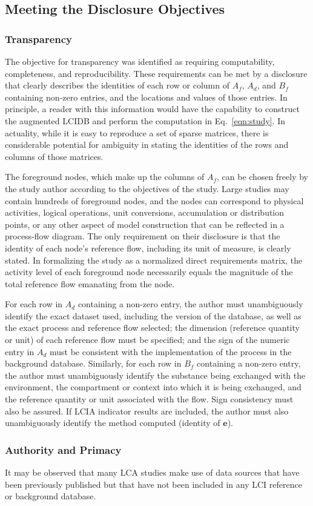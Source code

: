 


\subsection{Meeting the Disclosure Objectives}

\subsubsection{Transparency}

The objective for transparency was identified as requiring computability, completeness, and reproducibility.  These requirements can be met by a disclosure that clearly describes the identities of each row or column of $A_f$, $A_d$, and $B_f$ containing non-zero entries, and the locations and values of those entries.  In principle, a reader with this information would have the capability to construct the augmented LCIDB and perform the computation in Eq.~\ref{eqn:study}.  In actuality, while it is easy to reproduce a set of sparse matrices, there is considerable potential for ambiguity in stating the identities of the rows and columns of those matrices.

The foreground nodes, which make up the columns of $A_f$, can be chosen freely by the study author according to the objectives of the study.  Large studies may contain hundreds of foreground nodes, and the nodes can correspond to physical activities, logical operations, unit conversions, accumulation or distribution points, or any other aspect of model construction that can be reflected in a process-flow diagram.  The only requirement on their disclosure is that the identity of each node's reference flow, including its unit of measure, is clearly stated.  In formalizing the study as a normalized direct requirements matrix, the activity level of each foreground node necessarily equals the magnitude of the total reference flow emanating from the node.

For each row in $A_d$ containing a non-zero entry, the author must unambiguously identify the exact dataset used, including the version of the database, as well as the exact process and reference flow selected; the dimension (reference quantity or unit) of each reference flow must be specified; and the sign of the numeric entry in $A_d$ must be consistent with the implementation of the process in the background database.  Similarly, for each row in $B_f$ containing a non-zero entry, the author must unambiguously identify the substance being exchanged with the environment, the compartment or context into which it is being exchanged, and the reference quantity or unit associated with the flow.  Sign consistency must also be assured.  If LCIA indicator results are included, the author must also unambiguously identify the method computed (identity of $\mathbf{e}$).

\subsubsection{Authority and Primacy}



It may be observed that many LCA studies make use of data sources that have been previously published but that have not been included in any LCI reference or background database.
